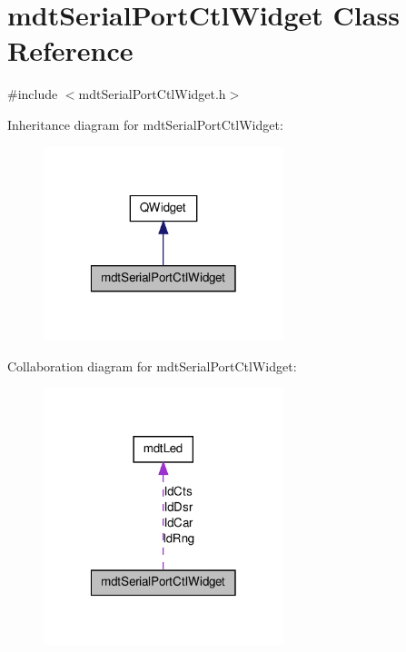 \hypertarget{classmdt_serial_port_ctl_widget}{\section{mdt\-Serial\-Port\-Ctl\-Widget Class Reference}
\label{classmdt_serial_port_ctl_widget}
}


{\ttfamily \#include $<$mdt\-Serial\-Port\-Ctl\-Widget.\-h$>$}



Inheritance diagram for mdt\-Serial\-Port\-Ctl\-Widget\-:\nopagebreak
\begin{figure}[H]
\begin{center}
\leavevmode
\includegraphics[width=198pt]{classmdt_serial_port_ctl_widget__inherit__graph}
\end{center}
\end{figure}


Collaboration diagram for mdt\-Serial\-Port\-Ctl\-Widget\-:\nopagebreak
\begin{figure}[H]
\begin{center}
\leavevmode
\includegraphics[width=198pt]{classmdt_serial_port_ctl_widget__coll__graph}
\end{center}
\end{figure}
